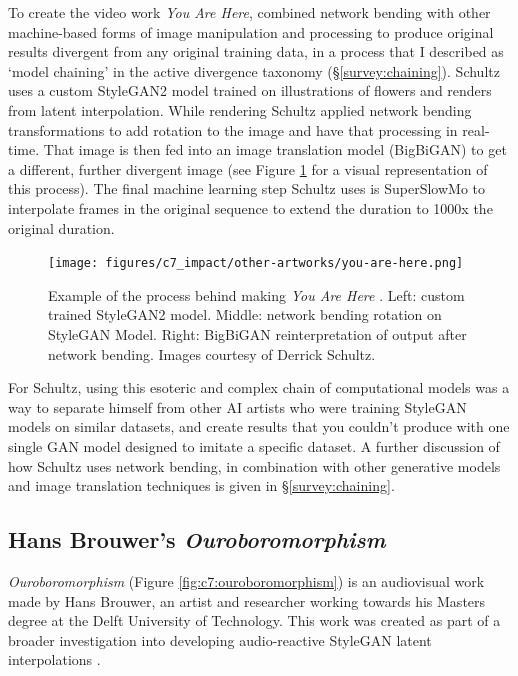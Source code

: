 To create the video work \textit{You Are Here}, \citep{schutlz2020you} combined network bending with other machine-based forms of image manipulation and processing to produce original results divergent from any original training data, in a process that I described as `model chaining' in the active divergence taxonomy (\S \ref{survey:chaining}).
Schultz uses a custom StyleGAN2 model trained on illustrations of flowers and renders from latent interpolation. 
While rendering Schultz applied network bending transformations to add rotation to the image and have that processing in real-time. 
That image is then fed into an image translation model (BigBiGAN) \citep{donahue2019large} to get a different, further divergent image (see Figure \ref{fig:c7:you-are-here} for a visual representation of this process). 
The final machine learning step Schultz uses is SuperSlowMo \citep{jiang2018super} to interpolate frames in the original sequence to extend the duration to 1000x the original duration.

\begin{figure}[!htb]
    \centering
    \captionsetup{justification=centering}
    \texttt{[image: figures/c7\_impact/other-artworks/you-are-here.png]}
    \caption[Example of the process behind making \textit{You Are Here}]{Example of the process behind making \textit{You Are Here} \citep{schutlz2020you}. Left: custom trained StyleGAN2 model. Middle: network bending rotation on StyleGAN Model. Right: BigBiGAN reinterpretation of output after network bending. Images courtesy of Derrick Schultz.}
    \label{fig:c7:you-are-here}
\end{figure}

For Schultz, using this esoteric and complex chain of computational models was a way to separate himself from other AI artists who were training StyleGAN models on similar datasets, and create results that you couldn't produce with one single GAN model designed to imitate a specific dataset. 
A further discussion of how Schultz uses network bending, in combination with other generative models and image translation techniques is given in \S \ref{survey:chaining}.

\subsection{Hans Brouwer's \textit{Ouroboromorphism}}

\textit{Ouroboromorphism} \citep{brouwer2020ourobo} (Figure \ref{fig:c7:ouroboromorphism}) is an audiovisual work made by Hans Brouwer, an artist and researcher working towards his Masters degree at the Delft University of Technology. 
This work was created as part of a broader investigation into developing audio-reactive StyleGAN latent interpolations \citep{brouwer2020audio}. 

